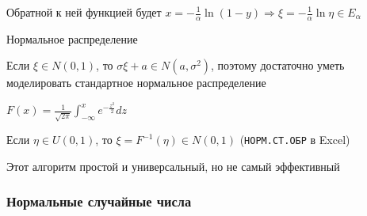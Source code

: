 Обратной к ней функцией будет $x = -\frac{1}{\alpha} \ln (1 - y) \Longrightarrow \xi = -\frac{1}{\alpha} \ln \eta \in E_\alpha$

\Ex Нормальное распределение

Если $\xi \in N(0, 1)$, то $\sigma \xi + a \in N(a, \sigma^2)$, поэтому достаточно уметь моделировать стандартное нормальное распределение

$F(x) = \frac{1}{\sqrt{2\pi}} \int_{-\infty}^x e^{-\frac{z^2}{2}} dz$

Если $\eta \in U(0, 1)$, то $\xi = F^{-1}(\eta) \in N(0, 1)$ (\texttt{НОРМ.СТ.ОБР} в Excel)

\Nota Этот алгоритм простой и универсальный, но не самый эффективный

\subsubsection{Нормальные случайные числа}

